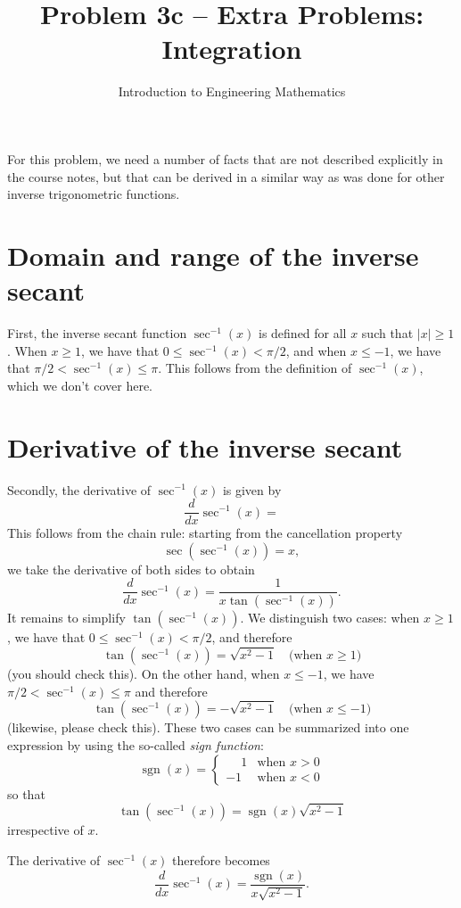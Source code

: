 \documentclass{article}
\title{Problem 3c -- Extra Problems: Integration}
\author{Introduction to Engineering Mathematics}
\DeclareMathOperator{\sgn}{sgn}
\begin{document}
\maketitle

For this problem, we need a number of facts that are not described explicitly in the course notes, but that can be derived in a similar way as was done for other inverse trigonometric functions.

\section{Domain and range of the inverse secant}

First, the inverse secant function $\sec^{-1}(x)$ is defined for all $x$ such that $|x| \ge 1$. When $x \ge 1$, we have that $0 \le \sec^{-1}(x) < \pi / 2$, and when $x \le -1$, we have that $\pi/2 < \sec^{-1}(x) \le \pi$. This follows from the definition of $\sec^{-1}(x)$, which we don't cover here.

\section{Derivative of the inverse secant}

Secondly, the derivative of $\sec^{-1}(x)$ is given by
\[
    \frac{d}{dx} \sec^{-1}(x) = 
\]
This follows from the chain rule: starting from the cancellation property
\[
    \sec \left( \sec^{-1}(x) \right) = x,
\]
we take the derivative of both sides to obtain
\[
    \frac{d}{dx} \sec^{-1}(x) = \frac{1}{x \tan\left( \sec^{-1}(x) \right)}.
\]
It remains to simplify $\tan \left( \sec^{-1}(x) \right)$. We distinguish two cases: when $x \ge 1$, we have that $0 \le \sec^{-1}(x) < \pi/2$, and therefore
\[
    \tan \left( \sec^{-1}(x) \right) = \sqrt{x^2 - 1} \quad \text{(when $x \ge 1$)}
\]
(you should check this). On the other hand, when $x \le -1$, we have $\pi/2 < \sec^{-1}(x) \le \pi$ and therefore
\[
    \tan \left( \sec^{-1}(x) \right) = - \sqrt{x^2 - 1} \quad \text{(when $x \le -1$)}
\]
(likewise, please check this). These two cases can be summarized into one expression by using the so-called \emph{sign function}:
\[
    \sgn(x) = \begin{cases}
        \phantom{+}1 & \text{when $x > 0$} \\
        -1 & \text{when $x < 0$}
    \end{cases}
\]
so that
\[
\tan \left( \sec^{-1}(x) \right) = \sgn(x) \sqrt{x^2 - 1}
\]
irrespective of $x$.

The derivative of $\sec^{-1}(x)$ therefore becomes
\[
    \frac{d}{dx} \sec^{-1}(x) = \frac{\sgn(x)}{x \sqrt{x^2 - 1}}.
\]
\end{document}
